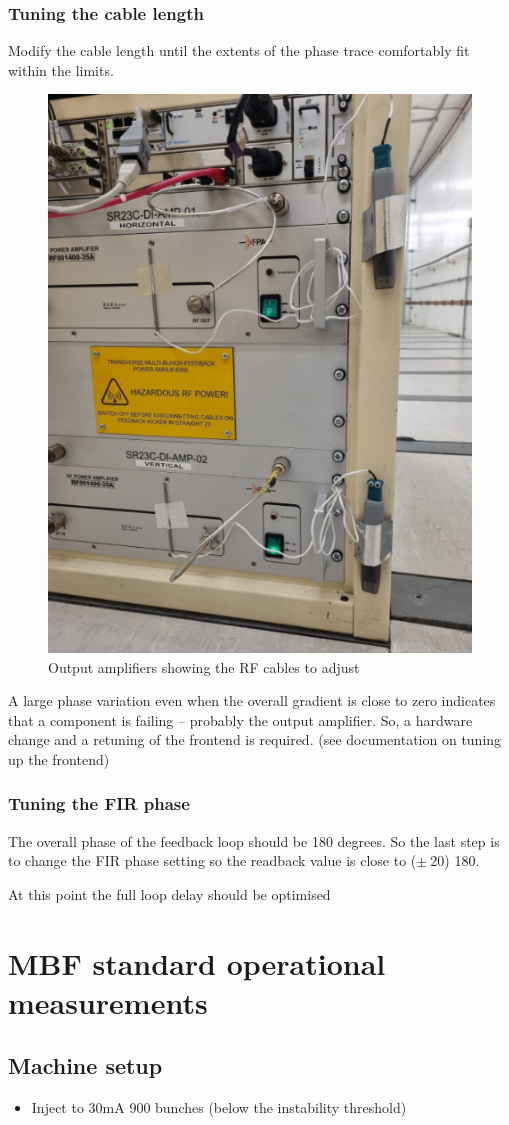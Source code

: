 \documentclass{report}
\begin{document}
\subsubsection{Tuning the cable length} 
Modify the cable length until the extents of the phase trace comfortably fit within the limits.  
\begin{figure}[ht]
    \centering
    \includegraphics[width=0.6\linewidth]{amp_front.png}
    \caption{Output amplifiers showing the RF cables to adjust}
    \label{fig:output_amplifiers}
\end{figure}
A large phase variation even when the overall gradient is close to zero indicates that a component is failing – probably the output amplifier. So, a hardware change and a retuning of the frontend is required. (see documentation on tuning up the frontend)
\subsubsection{Tuning the FIR phase}
The overall phase of the feedback loop should be 180 degrees. So the last step is to change the FIR phase setting so the readback value is close to ($\pm~20$) 180.

At this point the full loop delay should be optimised
\clearpage

\section{MBF standard operational measurements}
\subsection{Machine setup} 
\begin{itemize}
    \item {Inject to 30mA 900 bunches (below the instability threshold)}
\end{itemize}
\end{document}
